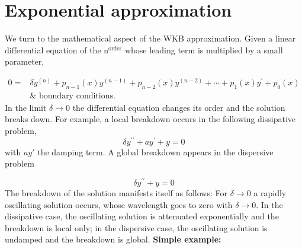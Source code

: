 \section{Exponential approximation}
We turn to the mathematical aspect of the WKB approximation. Given a linear differential equation of the $\text{n}^{\text{order}}$ whose leading term is multiplied by a small parameter,

\begin{equation}
\begin{aligned} 0=& \delta y^{(n)}+p_{n-1}(x) y^{(n-1)}+p_{n-2}(x) y^{(n-2)}+\cdots+p_{1}(x) y^{\prime}+p_{0}(x) \\ & \& \text { boundary conditions. } \end{aligned}
\end{equation}
In the limit $\delta\rightarrow 0$ the differential equation changes its order and the solution breaks down. For example, a local breakdown occurs in the following dissipative problem,
\begin{equation}
    \delta y^{\prime \prime}+a y^{\prime}+y=0
    \end{equation}
with $ay'$ the damping term. A global breakdown appears in the dispersive problem

\begin{equation}
    \delta y^{\prime \prime}+y=0
    \end{equation}
The breakdown of the solution manifests itself as follows: For $\delta\rightarrow 0$ a rapidly oscillating solution occurs, whose wavelength goes to zero with $\delta\rightarrow 0$. In the dissipative case, the oscillating solution is attenuated exponentially and the breakdown is local only; in the dispersive case, the oscillating solution is undamped and the breakdown is global.
\textbf{Simple example:}

